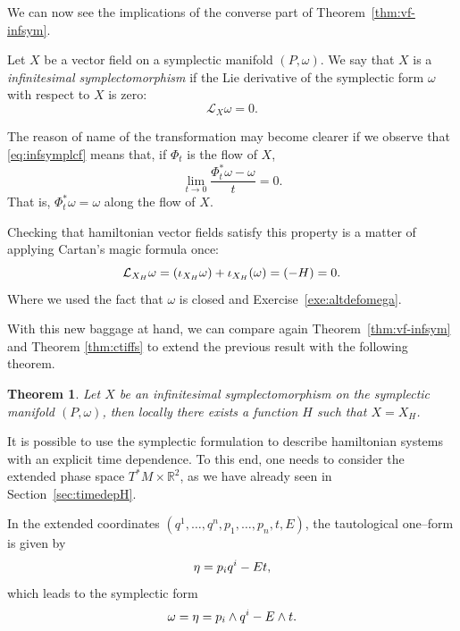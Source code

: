 \documentclass[english,fontsize=11pt,paper=a5,oneside]{scrbook}
\newcommand{\cL}{\mathcal{L}}
\newcommand{\R}{\mathbb{R}}
\let\d\relax
\newcommand{\d}{\mathrm{d}}
\newtheorem{theorem}{Theorem}[chapter]
\theoremstyle{definition}
\newenvironment{example}
  {\pushQED{\qed}\renewcommand{\qedsymbol}{$\lozenge$}\examplex}
  {\popQED\endexamplex}
\begin{document}
We can now see the implications of the converse part of Theorem~\ref{thm:vf-infsym}.

\begin{tcolorbox}
  Let $X$ be a vector field on a symplectic manifold $(P,\omega)$.
  We say that $X$ is a \emph{infinitesimal symplectomorphism} if the Lie derivative of the symplectic form $\omega$ with respect to $X$ is zero:
  \begin{equation}\label{eq:infsymplcf}
    \cL_X \omega = 0.
  \end{equation}
\end{tcolorbox}

The reason of name of the transformation may become clearer if we observe that \eqref{eq:infsymplcf} means that, if $\Phi_t$ is the flow of $X$,
\begin{equation}
\lim_{t\to 0} \frac{\Phi_t^*\omega - \omega}{t} = 0.
\end{equation}
That is, $\Phi_t^*\omega = \omega$ along the flow of $X$.

Checking that hamiltonian vector fields satisfy this property is a matter of applying Cartan's magic formula once:
\begin{equation}
  \cL_{X_H} \omega = \d(\iota_{X_H} \omega) + \iota_{X_H}(\d \omega)
  = \d(-\d H) = 0.
\end{equation}
Where we used the fact that $\omega$ is closed and Exercise~\ref{exe:altdefomega}.

With this new baggage at hand, we can compare again Theorem~\ref{thm:vf-infsym} and Theorem \ref{thm:ctiffs} to extend the previous result with the following theorem.

\begin{theorem}
  Let $X$ be an infinitesimal symplectomorphism on the symplectic manifold $(P,\omega)$, then locally there exists a function $H$ such that $X = X_H$.
\end{theorem}


\begin{example}[Time dependent hamiltonians]\label{ex:timedepH}
  It is possible to use the symplectic formulation to describe hamiltonian systems with an explicit time dependence.
  To this end, one needs to consider the extended phase space $T^*M\times\R^2$, as we have already seen in Section~\ref{sec:timedepH}.

  In the extended coordinates $(q^1, \ldots, q^n, p_1,\ldots,p_n,t,E)$, the tautological one--form is given by
  \begin{equation}
    \eta = p_i\d q^i -E\d t,
  \end{equation}
  which leads to the symplectic form
  \begin{equation}
    \omega = \d\eta = \d p_i \wedge \d q^i -\d E \wedge \d t.
  \end{equation}
\end{example}
\end{document}
